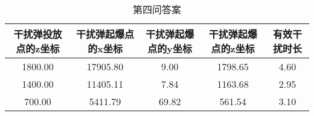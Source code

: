 \documentclass[../main.tex]{subfiles}
\begin{document}
\begin{table}[H]
\caption{第四问答案}
\label{tab:031} 
\centering
\begin{small}
\begin{tabular}{ccccc}
\toprule[1.5pt]
    干扰弹投放点的z坐标 &干扰弹起爆点的x坐标&干扰弹起爆点的y坐标&干扰弹起爆点的z坐标&有效干扰时长\\
\midrule[1pt]
1800.00             & 17905.80                 & 9.00     & 1798.65                    & 4.60  \\               
1400.00             & 11405.11                 & 7.84     & 1163.68                    & 2.95  \\               
700.00              & 5411.79                  & 69.82    & 561.54                    & 3.10  \\                
\bottomrule[1.5pt]
\end{tabular}
\end{small}
\end{table}
\end{document}
